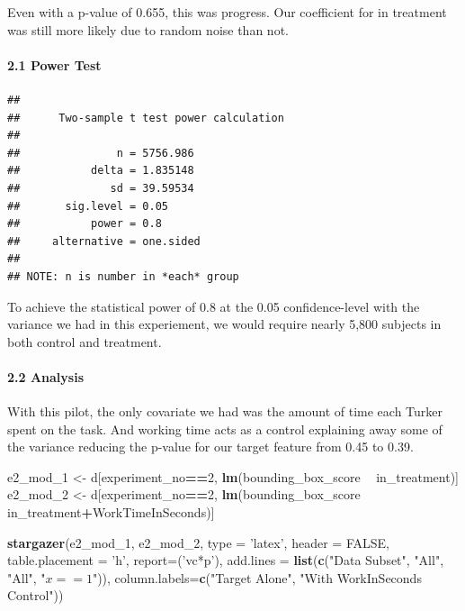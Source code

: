 \documentclass[
]{article}
\newenvironment{Shaded}{\begin{snugshade}}{\end{snugshade}}
\newcommand{\DataTypeTok}[1]{\textcolor[rgb]{0.13,0.29,0.53}{#1}}
\newcommand{\DecValTok}[1]{\textcolor[rgb]{0.00,0.00,0.81}{#1}}
\newcommand{\KeywordTok}[1]{\textcolor[rgb]{0.13,0.29,0.53}{\textbf{#1}}}
\newcommand{\NormalTok}[1]{#1}
\newcommand{\OperatorTok}[1]{\textcolor[rgb]{0.81,0.36,0.00}{\textbf{#1}}}
\newcommand{\OtherTok}[1]{\textcolor[rgb]{0.56,0.35,0.01}{#1}}
\newcommand{\StringTok}[1]{\textcolor[rgb]{0.31,0.60,0.02}{#1}}
\begin{document}
Even with a p-value of 0.655, this was progress. Our coefficient for in
treatment was still more likely due to random noise than not.

\hypertarget{power-test}{%
\paragraph{2.1 Power Test}\label{power-test}}

\begin{verbatim}
## 
##      Two-sample t test power calculation 
## 
##               n = 5756.986
##           delta = 1.835148
##              sd = 39.59534
##       sig.level = 0.05
##           power = 0.8
##     alternative = one.sided
## 
## NOTE: n is number in *each* group
\end{verbatim}

To achieve the statistical power of 0.8 at the 0.05 confidence-level
with the variance we had in this experiement, we would require nearly
5,800 subjects in both control and treatment.

\hypertarget{analysis}{%
\paragraph{2.2 Analysis}\label{analysis}}

With this pilot, the only covariate we had was the amount of time each
Turker spent on the task. And working time acts as a control explaining
away some of the variance reducing the p-value for our target feature
from 0.45 to 0.39.

\begin{Shaded}
\begin{Highlighting}[]
\NormalTok{e2_mod_}\DecValTok{1}\NormalTok{ <-}\StringTok{ }\NormalTok{d[experiment_no}\OperatorTok{==}\DecValTok{2}\NormalTok{, }\KeywordTok{lm}\NormalTok{(bounding_box_score }\OperatorTok{~}\StringTok{ }\NormalTok{in_treatment)]}
\NormalTok{e2_mod_}\DecValTok{2}\NormalTok{ <-}\StringTok{ }\NormalTok{d[experiment_no}\OperatorTok{==}\DecValTok{2}\NormalTok{, }\KeywordTok{lm}\NormalTok{(bounding_box_score }\OperatorTok{~}\StringTok{ }\NormalTok{in_treatment}\OperatorTok{+}\NormalTok{WorkTimeInSeconds)]}

\KeywordTok{stargazer}\NormalTok{(e2_mod_}\DecValTok{1}\NormalTok{,  e2_mod_}\DecValTok{2}\NormalTok{,}
          \DataTypeTok{type =} \StringTok{'latex'}\NormalTok{, }\DataTypeTok{header =} \OtherTok{FALSE}\NormalTok{, }\DataTypeTok{table.placement =} \StringTok{'h'}\NormalTok{, }\DataTypeTok{report=}\NormalTok{(}\StringTok{'vc*p'}\NormalTok{),}
          \DataTypeTok{add.lines =} \KeywordTok{list}\NormalTok{(}\KeywordTok{c}\NormalTok{(}\StringTok{"Data Subset"}\NormalTok{, }\StringTok{"All"}\NormalTok{, }\StringTok{"All"}\NormalTok{, }\StringTok{"$x==1$"}\NormalTok{)),}
          \DataTypeTok{column.labels=}\KeywordTok{c}\NormalTok{(}\StringTok{"Target Alone"}\NormalTok{, }\StringTok{"With WorkInSeconds Control"}\NormalTok{))}
\end{Highlighting}
\end{Shaded}
\end{document}
